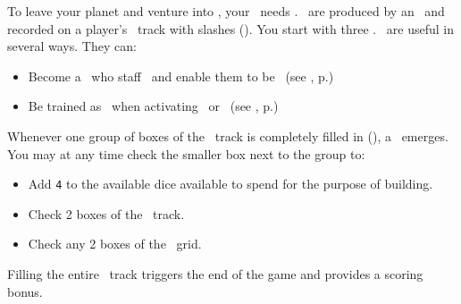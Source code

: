 To leave your planet and venture into \outerspace, your \planet\ needs \astronauts.  \astronauts\ are produced by an \academy\ and recorded on a player’s \population\ track with slashes (\gainastronautsymbol).  You start with three \astronauts.
\newline\newline
\astronauts\ are useful in several ways. They can:
\begin{itemize}
	\item Become a \specialist\ who staff \fortifications\ and enable them to be \activated\ (see , p.\pageref{sec:fortifications})
	\item Be trained as \pilots\ when activating \starships\ or \battleships\ (see , p.\pageref{sec:military})
\end{itemize}
Whenever one group of boxes of the \population\ track is completely filled in (\gainastronautsymbol), a \greatperson\ emerges.  You may at any time check the smaller box next to the group to:
\begin{itemize}
  \item Add \texttt{4} to the available dice available to spend for the purpose of building.
  \item Check 2 boxes of the \tech\ track.
  \item Check any 2 boxes of the \culture\ grid.
\end{itemize}
Filling the entire \population\ track triggers the end of the game and provides a scoring bonus.
